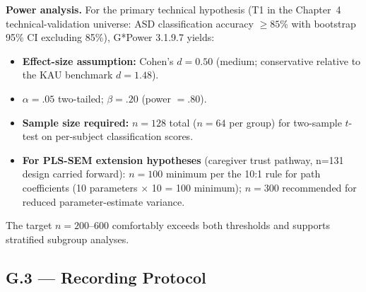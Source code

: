 \noindent\textbf{Power analysis.} For the primary technical hypothesis (T1 in the Chapter~4 technical-validation universe: ASD classification accuracy $\geq 85\%$ with bootstrap 95\% CI excluding 85\%), G*Power 3.1.9.7 yields:
\begin{itemize}[leftmargin=*, itemsep=2pt]
    \item \textbf{Effect-size assumption:} Cohen's $d = 0.50$ (medium; conservative relative to the KAU benchmark $d = 1.48$).
    \item \textbf{$\alpha = .05$} two-tailed; \textbf{$\beta = .20$} (power $= .80$).
    \item \textbf{Sample size required:} $n = 128$ total ($n = 64$ per group) for two-sample $t$-test on per-subject classification scores.
    \item \textbf{For PLS-SEM extension hypotheses} (caregiver trust pathway, n=131 design carried forward): $n = 100$ minimum per the 10:1 rule for path coefficients (10 parameters $\times$ 10 = 100 minimum); $n = 300$ recommended for reduced parameter-estimate variance.
\end{itemize}
The target $n = 200$--$600$ comfortably exceeds both thresholds and supports stratified subgroup analyses.

\subsection*{G.3 --- Recording Protocol}
\label{subsec:appg_recording_protocol}


